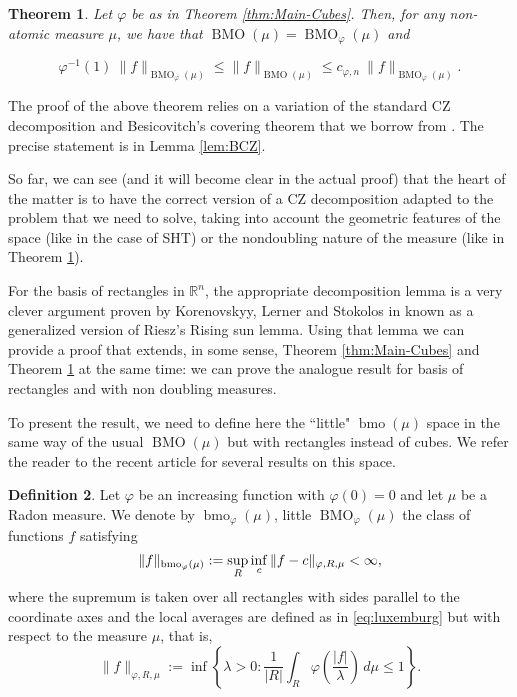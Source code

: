 \documentclass[11pt,a4paper]{amsart}
\newtheorem{theorem}{Theorem}[section]
\theoremstyle{definition}
\newtheorem{definition}[theorem]{Definition}
\theoremstyle{remark}
\numberwithin{equation}{section}
\DeclareMathOperator{\BMO}{BMO}
\DeclareMathOperator{\bmo}{bmo}
\def\R{{\mathbb R}}
\def\Xint#1{\mathchoice
  {\XXint\displaystyle\textstyle{#1}}%
  {\XXint\textstyle\scriptstyle{#1}}%
  {\XXint\scriptstyle\scriptscriptstyle{#1}}%
  {\XXint\scriptscriptstyle\scriptscriptstyle{#1}}%
  \!\int}
\def\XXint#1#2#3{{\setbox0=\hbox{$#1{#2#3}{\int}$}
    \vcenter{\hbox{$#2#3$}}\kern-.5\wd0}}
\def\avgint{\Xint-}
\numberwithin{equation}{section}
\begin{document}
\begin{theorem}\label{thm:non-doubling}
Let $\varphi$ be as in Theorem \ref{thm:Main-Cubes}. Then, for any non-atomic measure $\mu$, we have that  $\BMO(\mu)= \BMO_\varphi(\mu)$ and 

\begin{equation*}
\varphi^{-1}(1) \: \|f\|_{\BMO_\varphi(\mu)} \leq \|f\|_{\BMO(\mu)} \leq c_{\varphi,n} \: \|f\|_{\BMO_\varphi(\mu)}.
\end{equation*}
\end{theorem}


The proof of the above theorem relies on a variation of the standard CZ decomposition and Besicovitch's covering theorem that we borrow from \cite{OP-nondoubling}. The precise statement is in Lemma \ref{lem:BCZ}.

So far, we can see (and it will become clear in the actual proof) that the heart of the matter is to have the correct version of a CZ decomposition adapted to the problem that we need to solve, taking into account the geometric features of the space (like in the case of SHT) or the nondoubling nature of the measure (like in Theorem \ref{thm:non-doubling}).

For the basis of rectangles in $\R^n$, the appropriate decomposition lemma is a very clever argument proven by Korenovskyy, Lerner and Stokolos in \cite{KLS} known as a generalized version of Riesz's Rising sun lemma. Using that lemma we can provide a proof that extends, in some sense, Theorem \ref{thm:Main-Cubes} and Theorem \ref{thm:non-doubling} at the same time: we can prove the analogue result for basis of rectangles and with non doubling measures. 

To present the result, we need to define here the ``little" $\bmo(\mu)$ space in the same way of the usual $\BMO(\mu)$ but with rectangles instead of cubes.  We refer the reader to the recent article \cite{Hart-Torres-19} for several results on this space.


\begin{definition}
Let $\varphi$ be an increasing function with $\varphi(0)=0$  and let $\mu$ be a Radon  measure. We denote by $\bmo_\varphi(\mu)$, little $\BMO_\varphi(\mu)$ the class of functions $f$ satisfying
%
\begin{equation*}
\|f\|_{ \bmo_\varphi(\mu) } :=\sup_R \inf_c   
\|f-c\|_{\varphi,R, \mu }\\
%
< \infty,
\end{equation*}
%
where the supremum is taken over all rectangles with sides parallel to the coordinate axes  and  the local averages are defined as in \eqref{eq:luxemburg} but with respect to the measure $\mu$, that is,
\begin{equation*}
 \|f\|_{\varphi,R,\mu} :=
\inf\left\{  \lambda > 0 : \frac{1}{|R|}
\int_R\varphi\left(\frac{|f|}{\lambda}\right)\,d\mu \leq 1 \right\}.
\end{equation*}
%
\end{definition}
\end{document}
